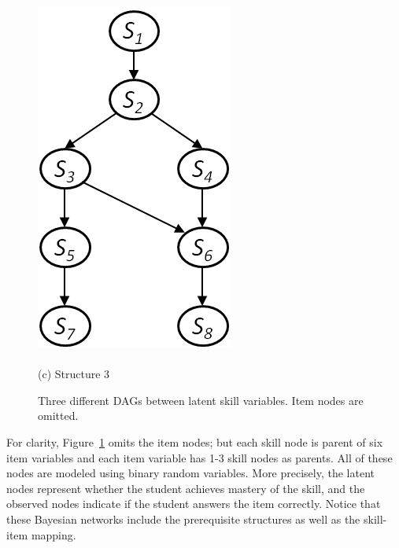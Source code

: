 \documentclass{edm_template}
\begin{document}
\begin{figure}[!ht]
\begin{minipage}[b]{0.45\linewidth}
			\includegraphics[width=0.7\linewidth]{figures/model3.png}\\~\\
			(c) Structure 3
		\end{minipage}	
		\caption{Three different DAGs between latent skill variables.  Item nodes are omitted.}
		\label{fig:syn-nets}
	\end{figure} 
	
	For clarity, Figure~\ref{fig:syn-nets}  omits the item nodes;
	but each skill node is parent of six item variables and each item variable has 1-3 skill nodes as parents.
	All of these nodes are modeled using binary random variables.
	More precisely, the latent  nodes represent whether the student  achieves mastery of the skill,
	and the observed nodes indicate if the student answers the item correctly.
	Notice that these Bayesian networks include the prerequisite structures as well as the skill-item mapping.
	
\end{document}
